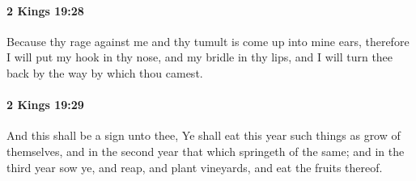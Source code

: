 		\paragraph{2 Kings 19:28} %
			\label{2KINGS-19-28}

			Because thy rage against me and thy tumult is come up into mine ears, therefore I will put my hook in thy nose, and my bridle in thy lips, and I will turn thee back by the way by which thou camest.


		\paragraph{2 Kings 19:29} %
			\label{2KINGS-19-29}

			And this shall be a sign unto thee, Ye shall eat this year such things as grow of themselves, and in the second year that which springeth of the same; and in the third year sow ye, and reap, and plant vineyards, and eat the fruits thereof.


